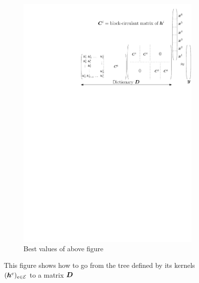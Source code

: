\begin{figure}[!ht]
\begin{subfigure}[b]{0.69\textwidth}
\includegraphics[width=\textwidth]{figures/pov-matrix.pdf}
\caption{Best values of above figure}
\end{subfigure}
\caption{This figure shows how to go from the tree defined by its kernels $(\bm{h}^e)_{e \in \mathcal E}$ to a matrix $\bm{D}$} \label{fig_tree_as_matrix}
\end{figure}




\clearpage


